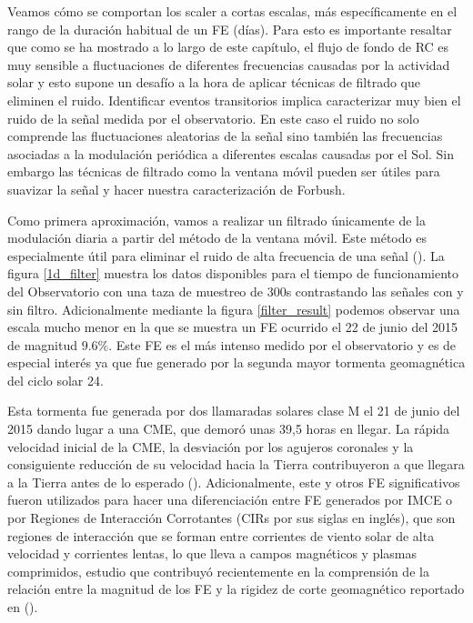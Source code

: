 Veamos cómo se comportan los scaler a cortas escalas, más específicamente en el rango de la duración habitual de un FE (días). Para esto es importante resaltar que como se ha mostrado a lo largo de este capítulo, el flujo de fondo de RC es muy sensible a fluctuaciones de diferentes frecuencias causadas por la actividad solar y esto supone un desafío a la hora de aplicar técnicas de filtrado que eliminen el ruido. Identificar eventos transitorios implica caracterizar muy bien el ruido de la señal medida por el observatorio. En este caso el ruido no solo comprende las fluctuaciones aleatorias de la señal sino también las frecuencias asociadas a la modulación periódica a diferentes escalas causadas por el Sol. Sin embargo las técnicas de filtrado como la ventana móvil pueden ser útiles para suavizar la señal y hacer nuestra caracterización de Forbush.

Como primera aproximación, vamos a realizar un filtrado únicamente de la modulación diaria a partir del método de la ventana móvil. Este método es especialmente útil para eliminar el ruido de alta frecuencia de una señal (\cite{Davies_2023}). La figura \ref{1d_filter} muestra los datos disponibles para el tiempo de funcionamiento del Observatorio con una taza de muestreo de 300s contrastando las señales con y sin filtro. Adicionalmente mediante  la figura \ref{filter_result} podemos observar una escala mucho menor en la que se muestra un FE ocurrido el 22 de junio del 2015 de magnitud $9.6\%$. Este FE es el más intenso medido por el observatorio y es de especial interés ya que fue generado por la segunda mayor tormenta geomagnética del ciclo solar 24. 

Esta tormenta fue generada por dos llamaradas solares clase M el 21 de junio del 2015 dando lugar a una CME, que demoró unas 39,5 horas en llegar.  La rápida velocidad inicial de la CME, la desviación por los agujeros coronales y la consiguiente reducción de su velocidad hacia la Tierra contribuyeron a que llegara a la Tierra antes de lo esperado (\cite{golpsdwamy_2018}). Adicionalmente, este  y otros FE significativos fueron utilizados para hacer una diferenciación entre FE generados por IMCE o por Regiones de Interacción Corrotantes (CIRs por sus siglas en inglés), que son regiones de interacción que se forman entre corrientes de viento solar de alta velocidad y corrientes lentas, lo que lleva a campos magnéticos y plasmas comprimidos, estudio que contribuyó recientemente en la comprensión de la relación entre la magnitud de los FE y la rigidez de corte geomagnético reportado en (\cite{wang_2023}).


